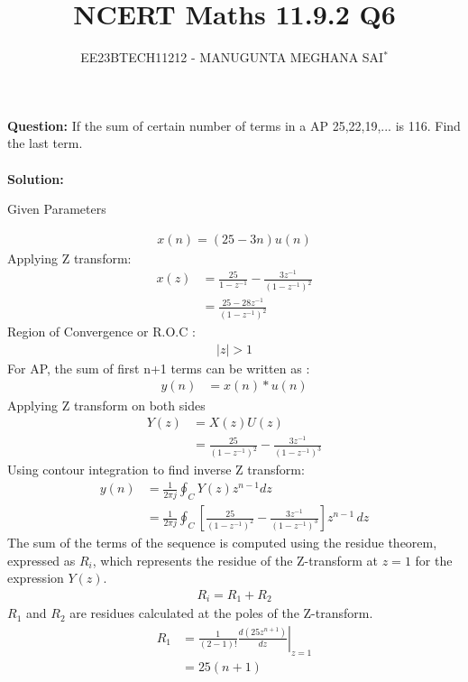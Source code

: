 \documentclass[journal,12pt,twocolumn]{IEEEtran}
\title{
	
	\title{NCERT Maths 11.9.2 Q6}
	\author{EE23BTECH11212 - MANUGUNTA MEGHANA SAI$^{*}$%
	}
	
	
}
\theoremstyle{remark}
\providecommand{\abs}[1]{\left\vert#1\right\vert}
\newcommand{\solution}{\noindent \textbf{Solution: }}
\begin{document}
\maketitle
	
\textbf{Question:} 
If the sum of certain number of terms in a AP 25,22,19,... is 116. Find the last term.\\
	\\

\solution
\begin{table}[h!]
	\centering
	 \resizebox{6cm}{!}{
	 	
	 	}
	 	\caption{Given Parameters}
	 	\label{tab:my_label}
 \end{table}

\begin{align}
	x(n) = (25 - 3n)u(n)
	\label{eq:1}
\end{align}
Applying Z transform:
\begin{align}
    x(z) &=\frac{25}{1-z^{-1}} - \frac{3z^{-1}}{(1-z^{-1})^2}\\
    &= \frac{25-28z^{-1}}{(1-z^{-1})^2} 
\end{align}
     Region of Convergence or R.O.C :
\begin{align}
     \abs{z}>1
\end{align}
For AP, the sum of first n+1 terms can be written as :
\begin{align}
	 y(n)&=x(n)*u(n)
\end{align}  
Applying Z transform on both sides
\begin{align}
	Y(z) &= X(z)U(z)\\
	&=\frac{25}{(1-z^{-1})^2} - \frac{3z^{-1}}{(1-z^{-1})^3}
\end{align}
Using contour integration to find inverse Z transform:
\begin{align}
	y(n) &= \frac{1}{2\pi j} \oint_C Y(z) z^{n-1} dz\\
	&= \frac{1}{2\pi j} \oint_C \left[ \frac{25}{(1-z^{-1})^2} - \frac{3z^{-1}}{(1-z^{-1})^3} \right]z^{n-1} \, dz
\end{align}
The sum of the terms of the sequence is computed using the residue theorem, expressed as $R_i$, which represents the residue of the Z-transform at $ z=1 $ for the expression $ Y(z) $.
\begin{align}
	R_i=R_1 + R_2
\end{align}
 $R_1$ and $R_2$ are residues calculated at the poles of the Z-transform.
\begin{align}
		R_1 &= \frac{1}{{(2-1)!}} \left. \frac{d (25z^{n+1})}{dz} \right|_{z=1} \\
	&=25(n+1)
\end{align}
\end{document}
